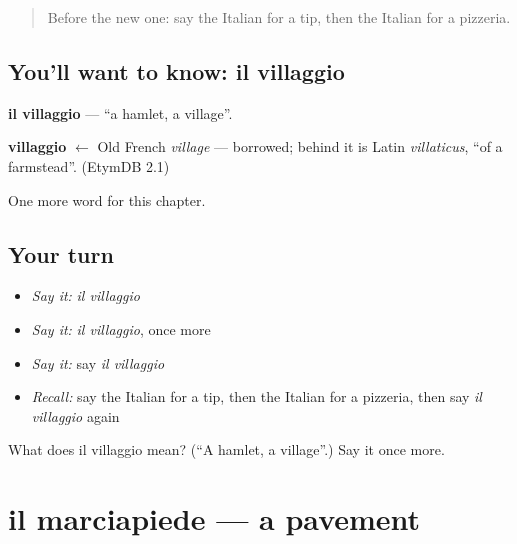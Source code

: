 \label{lesson:IT-C160-villaggio}



\begin{quote}
Before the new one: say the Italian for a tip, then the Italian for a pizzeria.
\end{quote}

\subsection*{You'll want to know: il villaggio}
\textbf{il villaggio} — \textquotedblleft{}a hamlet, a village\textquotedblright{}.

\begin{cousinweb}
\textbf{villaggio} $\leftarrow$ Old French \emph{village} — borrowed; behind it is Latin \emph{villaticus}, \textquotedblleft{}of a farmstead\textquotedblright{}. (EtymDB 2.1)
\end{cousinweb}

\begin{grammarlens}[title={What you've built}]
One more word for this chapter.
\end{grammarlens}

\subsection*{Your turn}
\begin{itemize}
\raggedright
  \item \emph{Say it:} \emph{il villaggio}
  \item \emph{Say it:} \emph{il villaggio}, once more
  \item \emph{Say it:} say \emph{il villaggio}
  \item \emph{Recall:} say the Italian for a tip, then the Italian for a pizzeria, then say \emph{il villaggio} again
\end{itemize}

\begin{tcolorbox}[breakable,colback=teal!4,colframe=teal!35!black,title={Before you move on}]
What does il villaggio mean? (\textquotedblleft{}A hamlet, a village\textquotedblright{}.) Say it once more.
\end{tcolorbox}
\section[il marciapiede]{il marciapiede — a pavement}

\label{lesson:IT-C160-marciapiede}



